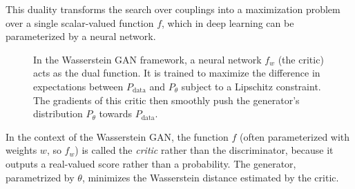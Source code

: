 This duality transforms the search over couplings into a maximization problem over a single scalar-valued function $f$, which in deep learning can be parameterized by a neural network.

\begin{figure}[h]
    \centering
    \caption{In the Wasserstein GAN framework, a neural network $f_w$ (the critic) acts as the dual function. It is trained to maximize the difference in expectations between $P_{\text{data}}$ and $P_\theta$ subject to a Lipschitz constraint. The gradients of this critic then smoothly push the generator's distribution $P_\theta$ towards $P_{\text{data}}$.}
    \label{fig:wgan_critic}
\end{figure}

In the context of the Wasserstein GAN, the function $f$ (often parameterized with weights $w$, so $f_w$) is called the \emph{critic} rather than the discriminator, because it outputs a real-valued score rather than a probability. The generator, parametrized by $\theta$, minimizes the Wasserstein distance estimated by the critic.

